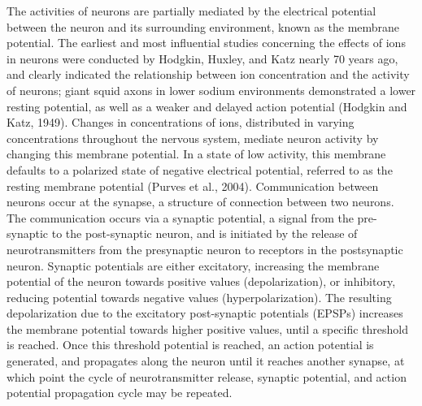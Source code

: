 \documentclass[11pt]{article}
\begin{document}
The activities of neurons are partially mediated by the electrical potential between the neuron and its surrounding environment, known as the membrane potential. The earliest and most influential studies concerning the effects of ions in neurons were conducted by Hodgkin, Huxley, and Katz nearly 70 years ago, and clearly indicated the relationship between ion concentration and the activity of neurons; giant squid axons in lower sodium environments demonstrated a lower resting potential, as well as a weaker and delayed action potential (Hodgkin and Katz, 1949). Changes in concentrations of ions, distributed in varying concentrations throughout the nervous system, mediate neuron activity by changing this membrane potential. In a state of low activity, this membrane defaults to a polarized state of negative electrical potential, referred to as the resting membrane potential (Purves et al., 2004). Communication between neurons occur at the synapse, a structure of connection between two neurons. The communication occurs via a synaptic potential, a signal from the pre-synaptic to the post-synaptic neuron, and is initiated by the release of neurotransmitters from the presynaptic neuron to receptors in the postsynaptic neuron. Synaptic potentials are either excitatory, increasing the membrane potential of the neuron towards positive values (depolarization), or inhibitory, reducing potential towards negative values (hyperpolarization). The resulting depolarization due to the excitatory post-synaptic potentials (EPSPs) increases the membrane potential towards higher positive values, until a specific threshold is reached. Once this threshold potential is reached, an action potential is generated, and propagates along the neuron until it reaches another synapse, at which point the cycle of neurotransmitter release, synaptic potential, and action potential propagation cycle may be repeated.\par

\end{document}

